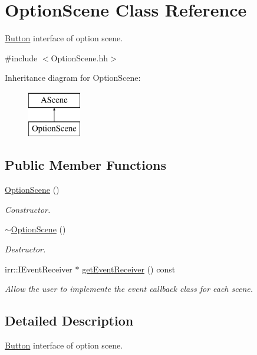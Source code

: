 \hypertarget{classOptionScene}{}\section{Option\+Scene Class Reference}
\label{classOptionScene}


\hyperlink{classButton}{Button} interface of option scene.  




{\ttfamily \#include $<$Option\+Scene.\+hh$>$}

Inheritance diagram for Option\+Scene\+:\begin{figure}[H]
\begin{center}
\leavevmode
\includegraphics[height=2.000000cm]{classOptionScene}
\end{center}
\end{figure}
\subsection*{Public Member Functions}
\begin{DoxyCompactItemize}
\item 
\hyperlink{classOptionScene_ac0dfacf1988c5dcfe2520970735fab10}{Option\+Scene} ()
\begin{DoxyCompactList}\small\item\em Constructor. \end{DoxyCompactList}\item 
\hyperlink{classOptionScene_ab8de71400c4ed7f2a47cedfedb13f327}{$\sim$\+Option\+Scene} ()
\begin{DoxyCompactList}\small\item\em Destructor. \end{DoxyCompactList}\item 
irr\+::\+I\+Event\+Receiver $\ast$ \hyperlink{classOptionScene_a8848b9040ee7fd9c1d05a22181c5e053}{get\+Event\+Receiver} () const
\begin{DoxyCompactList}\small\item\em Allow the user to implemente the event callback class for each scene. \end{DoxyCompactList}\end{DoxyCompactItemize}


\subsection{Detailed Description}
\hyperlink{classButton}{Button} interface of option scene. 

